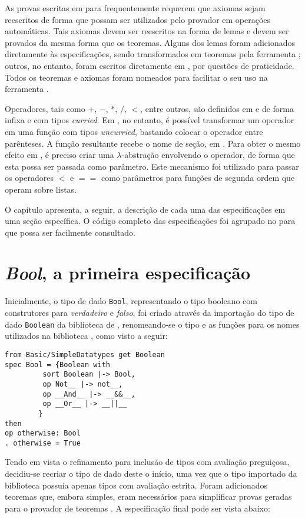 As provas escritas em \HOL para \Isabelle frequentemente requerem que axiomas sejam reescritos de forma que possam ser utilizados pelo provador em operações automáticas.
Tais axiomas devem ser reescritos na forma de lemas e devem ser provados da mesma forma que os teoremas.
Alguns dos lemas foram adicionados diretamente às especificações, sendo transformados em teoremas pela ferramenta \Hets; outros, no entanto, foram escritos diretamente em \HOL, por questões de praticidade.
Todos os teoremas e axiomas foram nomeados para facilitar o seu uso na ferramenta  \Isabelle.

Operadores, tais como $+$, $-$, $*$, $/$, $<$, entre outros, são definidos em \CASL e \Haskell de forma infixa e com tipos \textit{curried}.
Em \Haskell, no entanto, é possível transformar um operador em uma função com tipos \textit{uncurried}, bastando colocar o operador entre parênteses.
A função resultante recebe o nome de seção, em \Haskell.
Para obter o mesmo efeito em \HasCASL, é preciso criar uma $\lambda$-abstração envolvendo o operador, de forma que esta possa ser passada como parâmetro.
Este mecanismo foi utilizado para passar os operadores $<$ e $==$ como parâmetros para funções de segunda ordem que operam sobre listas.

O capítulo apresenta, a seguir, a descrição de cada uma das especificações em uma seção específica.
O código completo das especificações foi agrupado no  para que possa ser facilmente consultado.

\section{\textit{Bool}, a primeira especificação}

Inicialmente, o tipo de dado \Verb.Bool., representando o tipo booleano com construtores para \textit{verdadeiro} e \textit{falso}, foi criado através da importação do tipo de dado \Verb.Boolean. da biblioteca de \CASL, renomeando-se o tipo e as funções para os nomes utilizados na biblioteca \Prelude, como visto a seguir:

\begin{Verbatim}
from Basic/SimpleDatatypes get Boolean
spec Bool = {Boolean with 
         sort Boolean |-> Bool,
         op Not__ |-> not__,
         op __And__ |-> __&&__,
         op __Or__ |-> __||__
        }
then
op otherwise: Bool
. otherwise = True
\end{Verbatim}

Tendo em vista o refinamento para inclusão de tipos com avaliação preguiçosa, decidiu-se recriar o tipo de dado deste o início, uma vez que o tipo importado da biblioteca \CASL possuía apenas tipos com avaliação estrita.
Foram adicionados teoremas que, embora simples, eram necessários para simplificar provas geradas para o provador de teoremas \Isabelle.
A especificação final pode ser vista abaixo:

